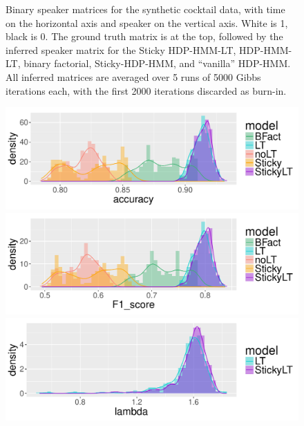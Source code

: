 \begin{figure}[tb]
\begin{center}
\caption{Binary speaker matrices for the synthetic cocktail data, with time on
  the horizontal axis and speaker on the vertical axis.  White is 1,
  black is 0.  The ground truth matrix is at the top, followed by the 
  inferred speaker matrix for the
  Sticky HDP-HMM-LT, HDP-HMM-LT, binary factorial, Sticky-HDP-HMM, and
  ``vanilla'' HDP-HMM.  All inferred matrices are averaged over 5 runs
  of 5000 Gibbs iterations each, with the first 2000 iterations
  discarded as burn-in. \label{fig:synth-cocktail-binary-matrices}}
\end{center}
\end{figure}

\begin{figure}[tb]
  \centering
  \begin{minipage}{0.75\textwidth}
  \includegraphics[width = \textwidth]{fig/cocktail/SSC1_s16_m12/abs_2000_n0.3_cp0/all_models/accuracy_density.pdf}
\end{minipage}

\begin{minipage}{0.75\textwidth}
  \includegraphics[width = \textwidth]{fig/cocktail/SSC1_s16_m12/abs_2000_n0.3_cp0/all_models/F1_score_density.pdf}
\end{minipage}

\begin{minipage}{0.75\textwidth}
  \includegraphics[width = \textwidth]{fig/cocktail/SSC1_s16_m12/abs_2000_n0.3_cp0/all_models/lambda_density.pdf}
\end{minipage}


\end{figure}

